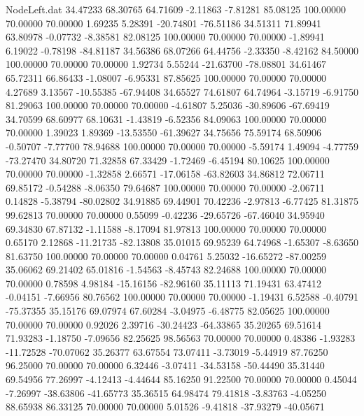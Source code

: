 \begin{filecontents}{NodeLeft.dat}
  34.47233   68.30765   64.71609    -2.11863   -7.81281   85.08125  100.00000   70.00000   70.00000    1.69235    5.28391  -20.74801  -76.51186
  34.51311   71.89941   63.80978    -0.07732   -8.38581   82.08125  100.00000   70.00000   70.00000   -1.89941    6.19022   -0.78198  -84.81187
  34.56386   68.07266   64.44756    -2.33350   -8.42162   84.50000  100.00000   70.00000   70.00000    1.92734    5.55244  -21.63700  -78.08801
  34.61467   65.72311   66.86433    -1.08007   -6.95331   87.85625  100.00000   70.00000   70.00000    4.27689    3.13567  -10.55385  -67.94408
  34.65527   74.61807   64.74964    -3.15719   -6.91750   81.29063  100.00000   70.00000   70.00000   -4.61807    5.25036  -30.89606  -67.69419
  34.70599   68.60977   68.10631    -1.43819   -6.52356   84.09063  100.00000   70.00000   70.00000    1.39023    1.89369  -13.53550  -61.39627
  34.75656   75.59174   68.50906    -0.50707   -7.77700   78.94688  100.00000   70.00000   70.00000   -5.59174    1.49094   -4.77759  -73.27470
  34.80720   71.32858   67.33429    -1.72469   -6.45194   80.10625  100.00000   70.00000   70.00000   -1.32858    2.66571  -17.06158  -63.82603
  34.86812   72.06711   69.85172    -0.54288   -8.06350   79.64687  100.00000   70.00000   70.00000   -2.06711    0.14828   -5.38794  -80.02802
  34.91885   69.44901   70.42236    -2.97813   -6.77425   81.31875   99.62813   70.00000   70.00000    0.55099   -0.42236  -29.65726  -67.46040
  34.95940   69.34830   67.87132    -1.11588   -8.17094   81.97813  100.00000   70.00000   70.00000    0.65170    2.12868  -11.21735  -82.13808
  35.01015   69.95239   64.74968    -1.65307   -8.63650   81.63750  100.00000   70.00000   70.00000    0.04761    5.25032  -16.65272  -87.00259
  35.06062   69.21402   65.01816    -1.54563   -8.45743   82.24688  100.00000   70.00000   70.00000    0.78598    4.98184  -15.16156  -82.96160
  35.11113   71.19431   63.47412    -0.04151   -7.66956   80.76562  100.00000   70.00000   70.00000   -1.19431    6.52588   -0.40791  -75.37355
  35.15176   69.07974   67.60284    -3.04975   -6.48775   82.05625  100.00000   70.00000   70.00000    0.92026    2.39716  -30.24423  -64.33865
  35.20265   69.51614   71.93283    -1.18750   -7.09656   82.25625   98.56563   70.00000   70.00000    0.48386   -1.93283  -11.72528  -70.07062
  35.26377   63.67554   73.07411    -3.73019   -5.44919   87.76250   96.25000   70.00000   70.00000    6.32446   -3.07411  -34.53158  -50.44490
  35.31440   69.54956   77.26997    -4.12413   -4.44644   85.16250   91.22500   70.00000   70.00000    0.45044   -7.26997  -38.63806  -41.65773
  35.36515   64.98474   79.41818    -3.83763   -4.05250   88.65938   86.33125   70.00000   70.00000    5.01526   -9.41818  -37.93279  -40.05671

\end{filecontents}
